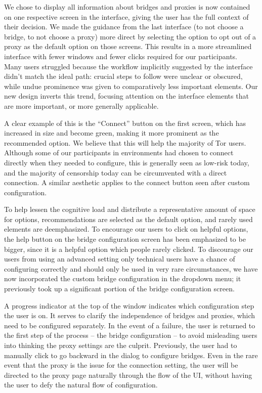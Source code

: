 \documentclass{template}
\begin{document}
We chose to display all information about bridges and proxies is now contained on one 
respective screen in the interface, giving the user has the full context of their decision.
We made the guidance from the last interface (to not choose a bridge, to not choose a proxy)
more direct by selecting the  option to opt out of a proxy as the default option on those screens. 
This results in a more streamlined interface with fewer windows
and fewer clicks required for our participants. \\

Many users struggled because the workflow implicitly suggested by the interface
didn't match the ideal path: crucial steps to follow were unclear or obscured,
while undue prominence was given to comparatively less important elements.
Our new design inverts this trend, focusing attention on the interface elements
that are more important, or more generally applicable.

A clear example of this is the ``Connect'' button on the first screen, which has
increased in size and become green, making it more prominent as the recommended
option. We believe that this will help the majority of Tor users. 
Although some of our participants in environments had chosen to connect
directly when they needed to configure, this is generally seen as low-risk today, and 
the majority of censorship today can be circumvented with a direct connection. 
A similar aesthetic applies to the connect button seen after custom
configuration.

To help lessen the cognitive load and distribute a representative amount of space
for options, recommendations are selected as the default option, and rarely used 
elements are deemphasized. To encourage our users to click on helpful options, 
the help button on the bridge configuration screen
has been emphasized to be bigger, since it is a helpful option which people rarely
clicked. To discourage our users from using an advanced setting only technical users 
have a chance of  configuring correctly and should only be used in very rare circumstances, 
we have now incorporated the custom bridge configuration in the dropdown menu; 
it previously took up a significant portion of the bridge configuration screen. 

A progress indicator at the top of the window indicates which configuration step
the user is on. It serves to clarify the independence of bridges and proxies,
which need to be configured separately. In the event of a failure, the user is
returned to the first step of the process -- the bridge configuration -- to
avoid misleading users into thinking the proxy settings are the culprit. Previously,
the user had to manually click to go backward in the dialog to configure bridges.
Even in the rare event that the proxy is the issue for the connection setting, the user
will be directed to the proxy page naturally through the flow of the UI, without
having the user to defy the natural flow of configuration. \\
\end{document}
